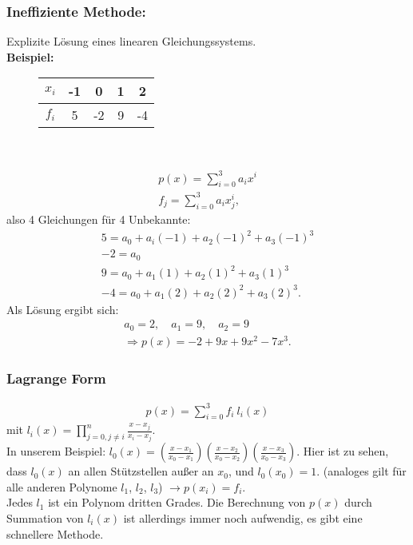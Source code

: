 \documentclass{scrartcl}
\begin{document}
\subsubsection*{ Ineffiziente Methode:}
Explizite Lösung eines linearen Gleichungssystems.\\
\textbf{Beispiel:}\\
\begin{figure}
\center

\begin{tabular}{|c||c|c|c|c|}

$x_i$ & -1 & 0 & 1 & 2 \\ 
\hline 
$f_i$ & 5 & -2 & 9 & -4 \\ 

\end{tabular}\\  
\end{figure}
\begin{align*}
p(x)=\sum_{i=0}^3 a_i x^i \\
f_j=\sum_{i=0}^3 a_i x_j^i,
\end{align*}
also 4 Gleichungen für 4 Unbekannte:
\begin{align*}
5=a_0+a_i(-1)+a_2 (-1)^2 + a_3 (-1)^3 \\
-2=a_0 \\
9=a_0+a_1 (1) + a_2 (1)^2 + a_3 (1)^3\\
-4 =a_0 + a_1 (2) + a_2 (2)^2 +a_3 (2)^3.
\end{align*}
Als Lösung ergibt sich: \begin{align*}
a_0=2, \quad a_1=9, \quad a_2=9 \\
\Rightarrow p(x)=-2+9 x + 9 x^2 - 7 x^3.
\end{align*}

\subsubsection*{Lagrange Form}
\begin{align*}
p(x)=\sum_{i=0}^3 f_i \ l_i(x)
\end{align*}
mit $l_i(x)=\prod_{j=0, j \neq i}^n \frac{x-x_j}{x_i-x_j}$. \\
In unserem Beispiel: $l_0(x)=(\frac{x-x_1}{x_0-x_1})(\frac{x-x_2}{x_0-x_2})(\frac{x-x_3}{x_0-x_3})$. Hier ist zu sehen, dass $l_0(x)$ an allen Stützstellen außer an $x_0$, und $l_0(x_0)=1$. (analoges gilt für alle anderen Polynome $l_1$, $l_2$, $l_3$)
$\rightarrow p(x_i)=f_i$. \\
Jedes $l_1$ ist ein Polynom dritten Grades.
Die Berechnung von $p(x)$ durch Summation von $l_i(x)$ ist allerdings immer noch aufwendig, es gibt eine schnellere Methode.
\end{document}
